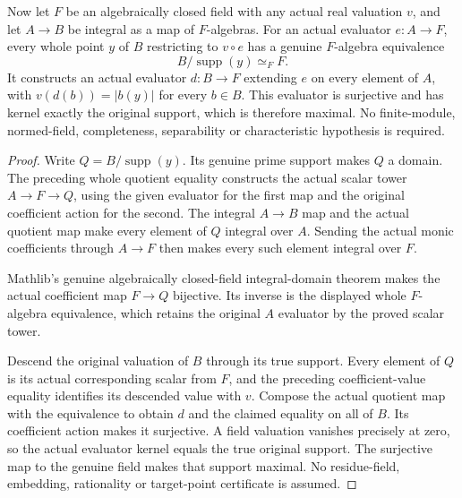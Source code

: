 \begin{theorem}
\label{spectrum:integral-rational-fibre}
\leanok
{}
Now let $F$ be an algebraically closed field with any actual real
valuation $v$, and let $A\to B$ be integral as a map of $F$-algebras.
For an actual evaluator $e:A\to F$, every whole point $y$ of $B$
restricting to $v\circ e$ has a genuine $F$-algebra equivalence
\[
 B/\operatorname{supp}(y)\simeq_F F.
\]
It constructs an actual evaluator $d:B\to F$ extending $e$ on every
element of $A$, with $v(d(b))=|b(y)|$ for every $b\in B$.
This evaluator is surjective and has kernel exactly the original
support, which is therefore maximal. No finite-module, normed-field,
completeness, separability or characteristic hypothesis is required.
\end{theorem}
\begin{proof}
Write $Q=B/\operatorname{supp}(y)$. Its genuine prime support makes
$Q$ a domain. The preceding whole quotient equality constructs the
actual scalar tower $A\to F\to Q$, using the given evaluator for the
first map and the original coefficient action for the second. The
integral $A\to B$ map and the actual quotient map make every element
of $Q$ integral over $A$. Sending the actual monic coefficients through
$A\to F$ then makes every such element integral over $F$.

Mathlib's genuine algebraically closed-field integral-domain theorem
makes the actual coefficient map $F\to Q$ bijective. Its inverse is the
displayed whole $F$-algebra equivalence, which retains the original
$A$ evaluator by the proved scalar tower.

Descend the original valuation of $B$ through its true support. Every
element of $Q$ is its actual corresponding scalar from $F$, and the
preceding coefficient-value equality identifies its descended value
with $v$. Compose the actual quotient map with the equivalence to obtain
$d$ and the claimed equality on all of $B$. Its coefficient action
makes it surjective. A field valuation vanishes precisely at zero, so
the actual evaluator kernel equals the true original support. The
surjective map to the genuine field makes that support maximal.
No residue-field, embedding, rationality or target-point certificate
is assumed.
\end{proof}

